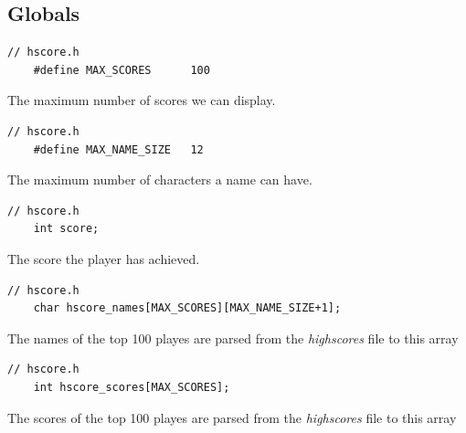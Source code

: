 \documentclass{article}
\begin{document}
\subsection*{Globals}
\begin{lstlisting}[style=CStyle]
	// hscore.h
	#define MAX_SCORES      100
\end{lstlisting}
The maximum number of scores we can display.
\begin{lstlisting}[style=CStyle]
	// hscore.h
	#define MAX_NAME_SIZE   12
\end{lstlisting}
The maximum number of characters a name can have.
\begin{lstlisting}[style=CStyle]
	// hscore.h
	int score;
\end{lstlisting}
The score the player has achieved.
\begin{lstlisting}[style=CStyle]
	// hscore.h
	char hscore_names[MAX_SCORES][MAX_NAME_SIZE+1];
\end{lstlisting}
The names of the top 100 playes are parsed from the \emph{highscores} file to this array
\begin{lstlisting}[style=CStyle]
	// hscore.h
	int hscore_scores[MAX_SCORES];
\end{lstlisting}
The scores of the top 100 playes are parsed from the \emph{highscores} file to this array
\newpage
\end{document}
